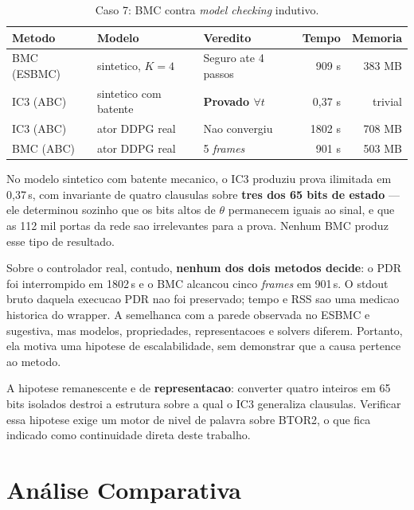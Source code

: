 \begin{table}[htb]
\caption{Caso 7: BMC contra \textit{model checking} indutivo.}
\label{tab:ic3}
\begin{center}
\begin{tabular}{l|l|l|r|r}
\hline
\textbf{Metodo} & \textbf{Modelo} & \textbf{Veredito} & \textbf{Tempo} & \textbf{Memoria} \\
\hline
BMC (ESBMC) & sintetico, $K{=}4$   & Seguro ate 4 passos   & 909 s  & 383 MB \\
IC3 (ABC)   & sintetico com batente & \textbf{Provado $\forall t$} & 0,37 s & trivial \\
IC3 (ABC)   & ator DDPG real        & Nao convergiu         & 1802 s & 708 MB \\
BMC (ABC)   & ator DDPG real        & 5 \textit{frames}     & 901 s  & 503 MB \\
\hline
\end{tabular}
\end{center}
\end{table}

No modelo sintetico com batente mecanico, o IC3 produziu prova ilimitada em
0,37\,s, com invariante de quatro clausulas sobre \textbf{tres dos 65 bits de
estado} --- ele determinou sozinho que os bits altos de $\theta$ permanecem iguais
ao sinal, e que as 112 mil portas da rede sao irrelevantes para a prova. Nenhum BMC
produz esse tipo de resultado.

Sobre o controlador real, contudo, \textbf{nenhum dos dois metodos decide}: o PDR
foi interrompido em 1802\,s e o BMC alcancou cinco \textit{frames} em 901\,s. O
stdout bruto daquela execucao PDR nao foi preservado; tempo e RSS sao uma medicao
historica do wrapper. A semelhanca com a parede observada no ESBMC e sugestiva,
mas modelos, propriedades, representacoes e solvers diferem. Portanto, ela motiva
uma hipotese de escalabilidade, sem demonstrar que a causa pertence ao metodo.

A hipotese remanescente e de \textbf{representacao}: converter quatro inteiros em 65
bits isolados destroi a estrutura sobre a qual o IC3 generaliza clausulas. Verificar
essa hipotese exige um motor de nivel de palavra sobre BTOR2, o que fica indicado
como continuidade direta deste trabalho.

\section{Análise Comparativa}

